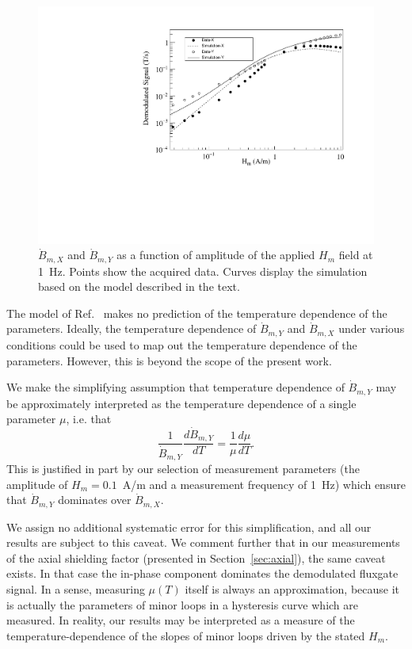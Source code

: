 \begin{figure}[h!]
  \begin{center}
    \includegraphics[width=\textwidth]{Jiles_and_data.pdf}
    \caption{$\dot{B}_{m,X}$ and $\dot{B}_{m,Y}$ as a function of
      amplitude of the applied $H_m$ field at 1~Hz.  Points show the
      acquired data.  Curves display the simulation based on the model
      described in the text.}
    \label{fig:data_and_simulation}
  \end{center}
\end{figure} 

The model of Ref.~\cite{bib:jiles} makes no prediction of the
temperature dependence of the parameters.  Ideally, the temperature
dependence of $\dot{B}_{m,Y}$ and $\dot{B}_{m,X}$ under various
conditions could be used to map out the temperature dependence of the
parameters.  However, this is beyond the scope of the present work.

We make the simplifying assumption that temperature dependence of
$\dot{B}_{m,Y}$ may be approximately interpreted as the temperature
dependence of a single parameter $\mu$, i.e. that
\begin{equation}
\frac{1}{\dot{B}_{m,Y}}\frac{d\dot{B}_{m,Y}}{dT}=\frac{1}{\mu}\frac{d\mu}{dT}.
\end{equation}
This is justified in part by our selection of measurement parameters
(the amplitude of $H_m=0.1$~A/m and a measurement frequency of 1~Hz)
which ensure that $\dot{B}_{m,Y}$ dominates over $\dot{B}_{m,X}$.

We assign no additional systematic error for this simplification, and
all our results are subject to this caveat.  We comment further that
in our measurements of the axial shielding factor (presented in
Section~\ref{sec:axial}), the same caveat exists.  In that case the
in-phase component dominates the demodulated fluxgate signal.  In a
sense, measuring $\mu(T)$ itself is always an approximation, because
it is actually the parameters of minor loops in a hysteresis curve
which are measured.  In reality, our results may be interpreted as a
measure of the temperature-dependence of the slopes of minor loops
driven by the stated $H_m$.

